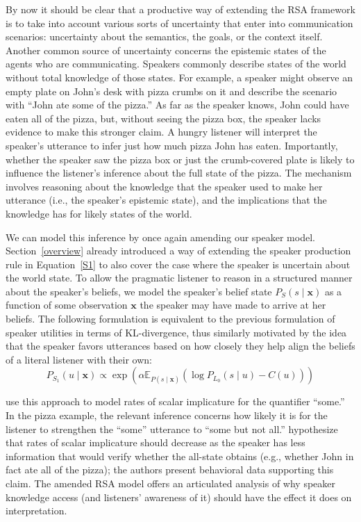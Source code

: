 \documentclass{sp}
\begin{document}
By now it should be clear that a productive way of extending the RSA framework is to take into account various sorts of uncertainty that enter into communication scenarios: uncertainty about the semantics, the goals, or the context itself. Another common source of uncertainty concerns the epistemic states of the agents who are communicating. Speakers commonly describe states of the world without total knowledge of those states. For example, a speaker might observe an empty plate on John's desk with pizza crumbs on it and describe the scenario with ``John ate some of the pizza.'' As far as the speaker knows, John could have eaten all of the pizza, but, without seeing the pizza box, the speaker lacks evidence to make this stronger claim. A hungry listener will interpret the speaker's utterance to infer just how much pizza John has eaten. Importantly, whether the speaker saw the pizza box or just the crumb-covered plate is likely to influence the listener's inference about the full state of the pizza. The mechanism involves reasoning about the knowledge that the speaker used to make her utterance (i.e., the speaker's epistemic state), and the implications that the knowledge has for likely states of the world.

We can model this inference by once again amending our speaker model.
Section~\ref{overview} already introduced a way of extending the speaker production rule in Equation~\eqref{S1} to also cover the case where the speaker is uncertain about the world state.
To allow the pragmatic listener to reason in a structured manner about the speaker's beliefs, we model the speaker's belief state $P_{S}(s \mid \textbf{x})$ as a function of some observation $\textbf{x}$ the speaker may have made to arrive at her beliefs.
The following formulation is equivalent to the previous formulation of speaker utilities in terms of KL-divergence, thus similarly motivated by the idea that the speaker favors utterances based on how closely they help align the beliefs of a literal listener with their own:
%
\begin{equation} \label{S1-epistemic}
P_{S_1}(u\mid \textbf{x}) \propto \exp (\alpha \mathbb{E}_{P(s\mid \textbf{x})}(\log P_{L_0}(s\mid u) - C(u)))
\end{equation}

\cite{goodmanstuhlmuller2013} use this approach to model rates of scalar implicature for the quantifier ``some.'' In the pizza example, the relevant inference concerns how likely it is for the listener to strengthen the ``some'' utterance to ``some but not all.'' \citeauthor{goodmanstuhlmuller2013} hypothesize that rates of scalar implicature should decrease as the speaker has less information that would verify whether the all-state obtains (e.g., whether John in fact ate all of the pizza); the authors present behavioral data supporting this claim. The amended RSA model offers an articulated analysis of why speaker knowledge access (and listeners' awareness of it) should have the effect it does on interpretation.
\end{document}
